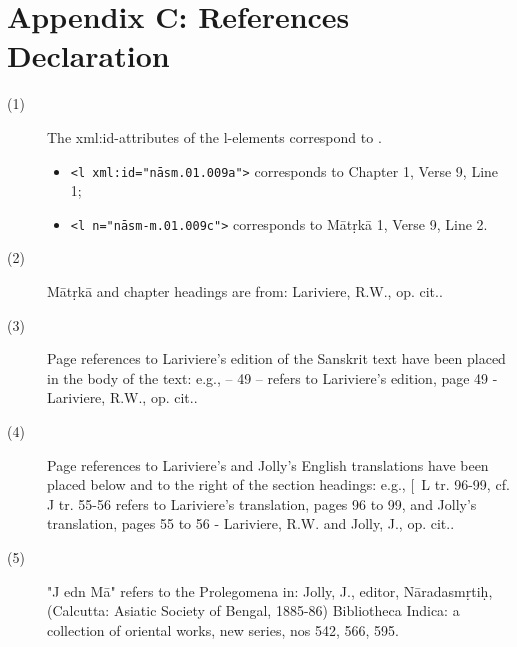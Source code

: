 \documentclass[article,12pt,a4paper]{memoir}%
\begin{document}
\chapter[{Appendix C: References Declaration}][{Appendix C: References Declaration}]{Appendix C: References Declaration}\begin{description}

\item[{(1)}]\hspace{1em}\hfill\linebreak
The xml:id-attributes of the l-elements correspond to \cite{nāsm-lariviere-tx}. \begin{itemize}
\item \texttt{<l xml:id="nāsm.01.009a">} corresponds to Chapter 1, Verse 9, Line 1;
\item \texttt{<l n="nāsm-m.01.009c">} corresponds to Mātṛkā 1, Verse 9, Line 2.
\end{itemize} 
\item[{(2)}]Mātṛkā and chapter headings are from: Lariviere, R.W., op. cit..
\item[{(3)}]Page references to Lariviere's edition of the Sanskrit text have been placed in the body of the text: e.g., -- 49 -- refers to Lariviere's edition, page 49 - Lariviere, R.W., op. cit..
\item[{(4)}]Page references to Lariviere's and Jolly's English translations have been placed below and to the right of the section headings: e.g., [ L tr. 96-99, cf. J tr. 55-56 refers to Lariviere's translation, pages 96 to 99, and Jolly's translation, pages 55 to 56 - Lariviere, R.W. and Jolly, J., op. cit..
\item[{(5)}]"J edn Mā" refers to the Prolegomena in: Jolly, J., editor, Nāradasmṛtiḥ, (Calcutta: Asiatic Society of Bengal, 1885-86) Bibliotheca Indica: a collection of oriental works, new series, nos 542, 566, 595.
\end{description} %
     
\end{document}
